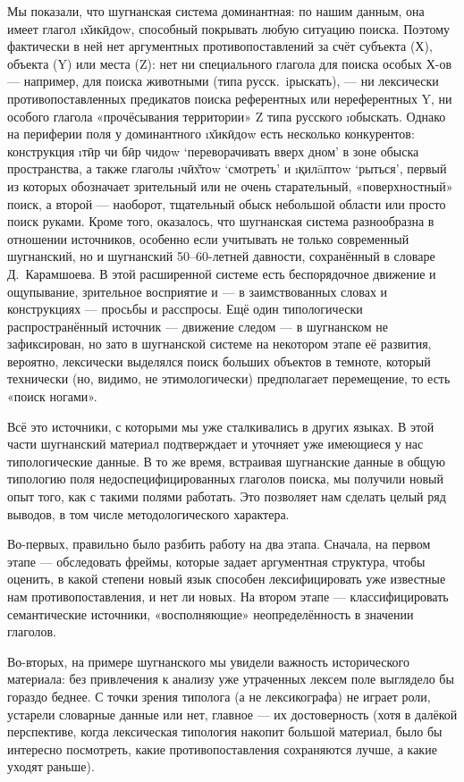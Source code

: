 Мы показали, что шугнанская система  доминантная: по нашим данным, она имеет глагол \i{х̌икӣдоw}, способный покрывать любую ситуацию поиска. Поэтому фактически в ней нет аргументных противопоставлений за счёт субъекта (Х), объекта (Y) или места (Z): нет ни специального глагола для поиска особых Х-ов — например, для поиска животными (типа русск.~i{рыскать}), — ни лексически противопоставленных предикатов поиска референтных или нереферентных Y, ни особого глагола «прочёсывания территории» Z типа русского \i{обыскать}. Однако на периферии поля  у доминантного \i{х̌икӣдоw} есть несколько конкурентов: конструкция \i{тӣр чи бӣр чидоw} ‘переворачивать вверх дном’ в зоне обыска пространства, а также глаголы \i{чӣх̌тоw} ‘смотреть’ и \i{қилāптоw} ‘рыться’, первый из которых обозначает зрительный или не очень старательный, «поверхностный» поиск, а второй — наоборот, тщательный обыск небольшой области или просто поиск руками. Кроме того, оказалось, что шугнанская система разнообразна в отношении источников, особенно если учитывать не только современный шугнанский, но и шугнанский 50–60-летней давности, сохранённый в словаре Д.~Карамшоева. В этой расширенной системе есть беспорядочное движение и ощупывание, зрительное восприятие и — в заимствованных словах и конструкциях — просьбы и расспросы. Ещё один типологически распространённый источник — движение следом — в шугнанском не зафиксирован, но зато в шугнанской системе на некотором этапе её развития, вероятно, лексически выделялся поиск больших объектов в темноте, который технически (но, видимо, не этимологически) предполагает перемещение, то есть «поиск ногами».

Всё это источники, с которыми мы уже сталкивались в других языках. В этой части шугнанский материал подтверждает и уточняет уже имеющиеся у нас типологические данные. В то же время, встраивая шугнанские данные в общую типологию поля недоспецифицированных глаголов поиска, мы получили новый опыт того, как с такими полями работать. Это позволяет нам сделать целый ряд выводов, в том числе методологического характера.

Во-первых, правильно было разбить работу на два этапа. Сначала, на первом этапе — обследовать фреймы, которые задает аргументная структура, чтобы оценить, в какой степени новый язык способен лексифицировать уже известные нам противопоставления, и нет ли новых. На втором этапе — классифицировать семантические источники, «восполняющие» неопределённость в значении глаголов.

Во-вторых, на примере шугнанского мы увидели важность исторического материала: без привлечения к анализу уже утраченных лексем поле выглядело бы гораздо беднее. С точки зрения типолога (а не лексикографа) не играет роли, устарели словарные данные или нет, главное — их достоверность (хотя в далёкой перспективе, когда лексическая типология накопит большой материал, было бы интересно посмотреть, какие противопоставления сохраняются лучше, а какие уходят раньше).

